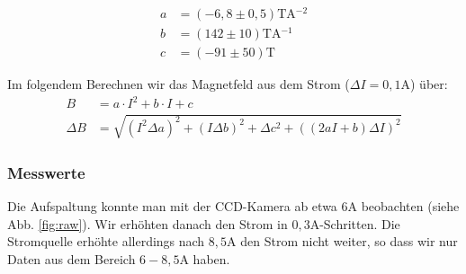 \begin{align*}
a &= \si{(-6,8 \pm 0,5)\tesla\ampere^{-2}}\\
b &= \si{(142 \pm 10) \tesla\ampere^{-1}}\\
c &= \si{(-91 \pm 50)\tesla}
\end{align*}

Im folgendem Berechnen wir das Magnetfeld aus dem Strom ($\Delta I = \si{0,1 \ampere}$) über:
\begin{align*}
B &= a\cdot I^2 + b \cdot I + c\\
\Delta B &= \sqrt{(I^2\Delta a)^2 + (I \Delta b)^2 + \Delta c^2 + ((2aI+b)\Delta I)^2}
\end{align*}

\subsubsection{Messwerte}
Die Aufspaltung konnte man mit der CCD-Kamera ab etwa $6\si{\ampere}$ beobachten (siehe Abb. \ref{fig:raw}). Wir erhöhten danach den Strom in $0,3\si{\ampere}$-Schritten. Die Stromquelle erhöhte allerdings nach $8,5\si{\ampere}$ den Strom nicht weiter, so dass wir nur Daten aus dem Bereich $6-8,5\si{\ampere}$ haben.
